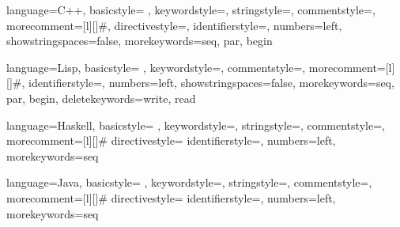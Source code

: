 \documentclass{l4proj}
\begin{document}
\makeatletter
{} {language=C++,
                basicstyle=%
                \ttfamily
                \lst@ifdisplaystyle\scriptsize\fi,
                keywordstyle=\color{blue}\ttfamily,
                stringstyle=\color{red}\ttfamily,
                commentstyle=\color{gray}\ttfamily,
                morecomment=[l][\color{magenta}]{\#},
                directivestyle={\color{green}},
                identifierstyle=\color{purple},
                numbers=left,
                showstringspaces=false,
                morekeywords={seq, par, begin}
}
\makeatother



\makeatletter
{} {language=Lisp,
                basicstyle=%
                \ttfamily
                \lst@ifdisplaystyle\scriptsize\fi,
                keywordstyle=\color{blue}\ttfamily,
                commentstyle=\color{gray}\ttfamily,
                morecomment=[l][\color{magenta}]{\#},
                identifierstyle=\color{purple},
                numbers=left,
                showstringspaces=false,
                morekeywords={seq, par, begin},
                deletekeywords={write, read}
}
\makeatother


\makeatletter
{} {language=Haskell,
                basicstyle=%
                \ttfamily
                \lst@ifdisplaystyle\scriptsize\fi,
                keywordstyle=\color{blue}\ttfamily,
                stringstyle=\color{red}\ttfamily,
                commentstyle=\color{gray}\ttfamily,
                morecomment=[l][\color{magenta}]{\#}
                directivestyle={\color{green}}
                identifierstyle=\color{purple},
                numbers=left,
                morekeywords={seq}
}
\makeatother


\makeatletter
{} {language=Java,
                basicstyle=%
                \ttfamily
                \lst@ifdisplaystyle\scriptsize\fi,
                keywordstyle=\color{blue}\ttfamily,
                stringstyle=\color{red}\ttfamily,
                commentstyle=\color{gray}\ttfamily,
                morecomment=[l][\color{magenta}]{\#}
                directivestyle={\color{green}}
                identifierstyle=\color{purple},
                numbers=left,
                morekeywords={seq}
}
\makeatother


\newcommand\YAMLcolonstyle{\color{red}\mdseries}
\newcommand\YAMLkeystyle{\color{black}\bfseries}
\newcommand\YAMLvaluestyle{\color{blue}\mdseries}
\end{document}

